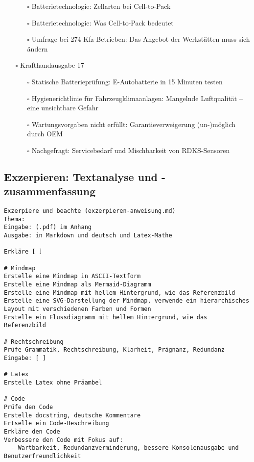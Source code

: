 \documentclass{vorlage-design-main}
\begin{document}
\begin{itemize}
  \begin{itemize}

  \item[$\square$]
    Batterietechnologie: Zellarten bei Cell-to-Pack
  \item[$\square$]
    Batterietechnologie: Was Cell-to-Pack bedeutet
  \item[$\square$]
    Umfrage bei 274 Kfz-Betrieben: Das Angebot der Werkstätten muss sich
    ändern
  \end{itemize}
\item[$\square$]
  Krafthandausgabe 17

  \begin{itemize}

  \item[$\square$]
    Statische Batterieprüfung: E-Autobatterie in 15 Minuten testen
  \item[$\square$]
    Hygienerichtlinie für Fahrzeugklimaanlagen: Mangelnde Luftqualität
    -- eine unsichtbare Gefahr
  \item[$\square$]
    Wartungsvorgaben nicht erfüllt: Garantieverweigerung (un-)möglich
    durch OEM
  \item[$\square$]
    Nachgefragt: Servicebedarf und Mischbarkeit von RDKS-Sensoren
  \end{itemize}
\end{itemize}

\newpage

\subsection{Exzerpieren: Textanalyse und
-zusammenfassung}\label{exzerpieren-textanalyse-und--zusammenfassung}

\begin{lstlisting}
Exzerpiere und beachte (exzerpieren-anweisung.md)
Thema:
Eingabe: (.pdf) im Anhang
Ausgabe: in Markdown und deutsch und Latex-Mathe

Erkläre [ ]

# Mindmap
Erstelle eine Mindmap in ASCII-Textform
Erstelle eine Mindmap als Mermaid-Diagramm
Erstelle eine Mindmap mit hellem Hintergrund, wie das Referenzbild
Erstelle eine SVG-Darstellung der Mindmap, verwende ein hierarchisches Layout mit verschiedenen Farben und Formen
Erstelle ein Flussdiagramm mit hellem Hintergrund, wie das Referenzbild

# Rechtschreibung
Prüfe Grammatik, Rechtschreibung, Klarheit, Prägnanz, Redundanz
Eingabe: [ ]

# Latex
Erstelle Latex ohne Präambel

# Code
Prüfe den Code
Erstelle docstring, deutsche Kommentare
Ertselle ein Code-Beschreibung
Erkläre den Code
Verbessere den Code mit Fokus auf:
  - Wartbarkeit, Redundanzverminderung, bessere Konsolenausgabe und Benutzerfreundlichkeit
\end{lstlisting}
\end{document}
